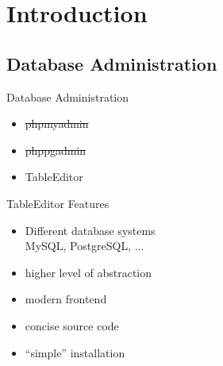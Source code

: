 
\section{Introduction}


\subsection{Database Administration}
\begin{frame}{Database Administration}
\begin{itemize}
\item \sout{phpmyadmin}
\item \sout{phppgadmin}
\item TableEditor
\end{itemize}
\end{frame}

\begin{frame}{TableEditor Features}
\begin{itemize}
\item Different database systems \\
      MySQL, PostgreSQL, ...
\item higher level of abstraction
\item modern frontend
\item concise source code
\item ``simple'' installation
\end{itemize}
\end{frame}

